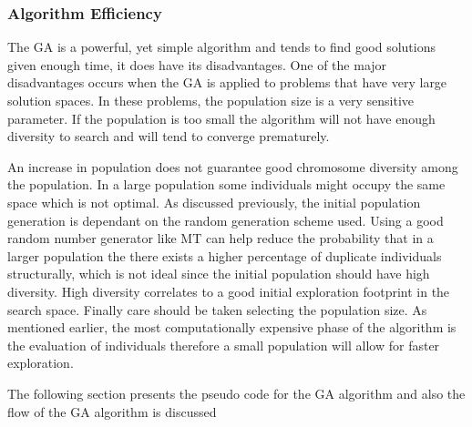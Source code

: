 \subsubsection{Algorithm Efficiency}
The \gls{GA} is a powerful, yet simple algorithm and tends to find good solutions given enough time, it does have its disadvantages. One of the major disadvantages occurs when the \gls{GA} is applied to problems that have very large solution spaces. In these problems, the population size is a very sensitive parameter\cite{AdaptiveSAGA,HetergeneousGA,SelfAdaptiveDataMiningGA,PatternDetectionGA}. If the population is too small the algorithm will not have enough diversity to search and will tend to converge prematurely. 

An increase in population does not guarantee good chromosome diversity among the population. In a large population some individuals might occupy the same space which is not optimal. As discussed previously, the initial population generation is dependant on the random generation scheme used. Using a good random number generator like \gls{MT} can help reduce the probability that in a larger population the there exists a higher percentage of duplicate individuals structurally, which is not ideal since the initial population should have high diversity. High diversity correlates to a good initial exploration footprint in the search space. Finally care should be taken selecting the population size. As mentioned earlier, the most computationally expensive phase of the algorithm is the evaluation of individuals therefore a small population will allow for faster exploration.


The following section presents the pseudo code for the \gls{GA} algorithm and also the flow of the \gls{GA} algorithm is discussed
